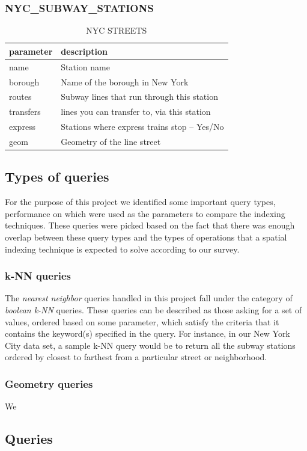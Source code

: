 \documentclass{sig-alternate-05-2015}
\begin{document}
\subsubsection{NYC_SUBWAY_STATIONS}
\begin{table}[!ht]
\begin{tabular}{ |l|l| }
\hline
parameter & description\\
\hline
name & Station name\\
\hline
borough & Name of the borough in New York \\
\hline
routes & Subway lines that run through this station\\
\hline
transfers & lines you can transfer to, via this station\\
\hline
express & Stations where express trains stop -- Yes/No\\
\hline
geom & Geometry of the line street\\
\hline
\end{tabular}
\caption{NYC STREETS}
\label{tab: streets}
\end{table}

\subsection{Types of queries}
For the purpose of this project we identified some important query types, performance on which were used as the parameters to compare the indexing techniques. These queries were picked based on the fact that there was enough overlap between these query types and the types of operations that a spatial indexing technique is expected to solve according to our survey.
\subsubsection{k-NN queries}
The \textit{nearest neighbor} queries handled in this project fall under the category of \textit{boolean k-NN} queries. These queries can be described as those asking for a set of values, ordered based on some parameter, which satisfy the criteria that it contains the keyword(s) specified in the query. For instance, in our New York City data set, a sample k-NN query would be to return all the subway stations ordered by closest to farthest from a particular street or neighborhood.
\subsubsection{Geometry queries}
We 
\subsection{Queries}
\end{document}
